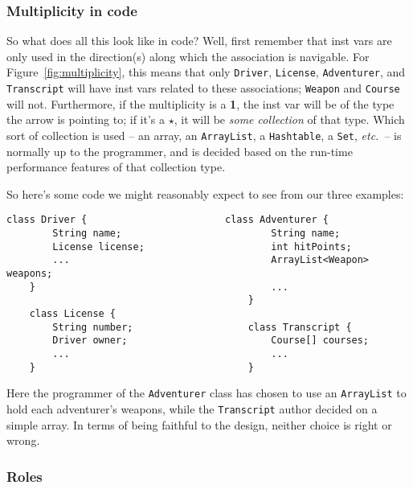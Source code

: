 \subsubsection{Multiplicity in code}

So what does all this look like in code? Well, first remember that inst vars
are only used in the direction(s) along which the association is navigable.
For Figure~\ref{fig:multiplicity}, this means that only \texttt{Driver},
\texttt{License}, \texttt{Adventurer}, and \texttt{Transcript} will have inst
vars related to these associations; \texttt{Weapon} and \texttt{Course} will
not. Furthermore, if the multiplicity is a \textbf{1}, the inst var will be of
the type the arrow is pointing to; if it's a $\star$, it will be \textit{some
collection} of that type. Which sort of collection is used -- an array, an
\texttt{ArrayList}, a \texttt{Hashtable}, a \texttt{Set}, \textit{etc.}~-- is
normally up to the programmer, and is decided based on the run-time
performance features of that collection type.

So here's some code we might reasonably expect to see from our three examples:

\begin{Verbatim}[fontsize=\small,samepage=true,frame=single]
    class Driver {                        class Adventurer {
        String name;                          String name;
        License license;                      int hitPoints;
        ...                                   ArrayList<Weapon> weapons;
    }                                         ...
                                          }
    class License {
        String number;                    class Transcript {
        Driver owner;                         Course[] courses;
        ...                                   ...
    }                                     }
\end{Verbatim}

Here the programmer of the \texttt{Adventurer} class has chosen to use an
\texttt{ArrayList} to hold each adventurer's weapons, while the
\texttt{Transcript} author decided on a simple array. In terms of being
faithful to the design, neither choice is right or wrong.

\subsubsection{Roles}

